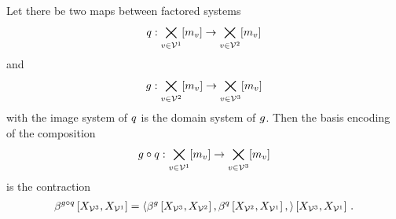 \begin{theorem}
    \label{the:compositionByContraction}
    Let there be two maps between factored systems
    \begin{align*}
        q : \bigtimes_{v\in\mathcal{V}^{1}}[m_{v}] \rightarrow \bigtimes_{v\in\mathcal{V}^{2}}[m_{v}]
    \end{align*}
    and
    \begin{align*}
        g : \bigtimes_{v\in\mathcal{V}^{2}}[m_{v}] \rightarrow \bigtimes_{v\in\mathcal{V}^{3}}[m_{v}]
    \end{align*}
    with the image system of $q$ is the domain system of $g$.
    Then the basis encoding of the composition
    \begin{align*}
        {g}\circ{q} : \bigtimes_{v\in\mathcal{V}^{1}}[m_{v}] \rightarrow \bigtimes_{v\in\mathcal{V}^{3}}[m_{v}]
    \end{align*}
    is the contraction
    \begin{align*}
        \beta^{{g}\circ{q}}\left[X_{\mathcal{V}^{3}},X_{\mathcal{V}^{1}}\right]
        = \left\langle 
            \beta^{g}\left[X_{\mathcal{V}^{3}},X_{\mathcal{V}^{2}}\right],
            \beta^{q}\left[X_{\mathcal{V}^{2}},X_{\mathcal{V}^{1}}\right],
        \right\rangle \left[ X_{\mathcal{V}^{3}},X_{\mathcal{V}^{1}} \right] \, .
    \end{align*}
\end{theorem}
